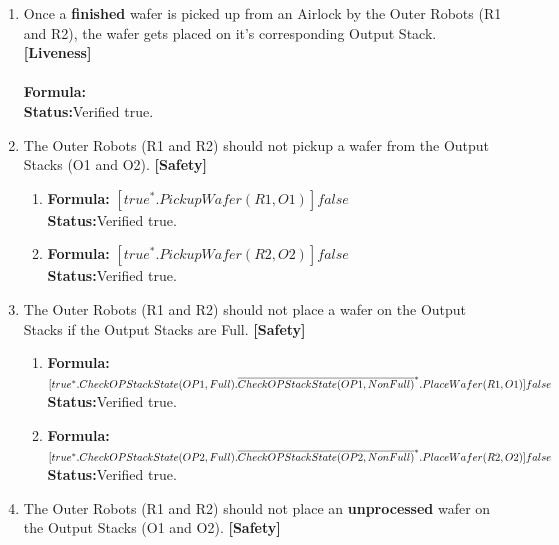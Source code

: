 \documentclass[a4paper,12pt]{article}
\begin{document}
\begin{enumerate}
		\item Once a \textbf{finished} wafer is picked up from an Airlock by the Outer Robots (R1 and R2), the wafer gets placed on it's corresponding Output Stack. \textbf{[Liveness]}
		\\
		\\\textbf{Formula:} 
		\\\textbf{Status:}Verified true.
		\item The Outer Robots (R1 and R2) should not pickup a wafer from the Output Stacks (O1 and O2). \textbf{[Safety]}
		\begin{enumerate}
			\item \textbf{Formula:} $[true^* . PickupWafer(R1, O1)] false$
			\\\textbf{Status:}Verified true.
			\item \textbf{Formula:} $[true^* . PickupWafer(R2, O2)] false$
			\\\textbf{Status:}Verified true.
		\end{enumerate}
		\item The Outer Robots (R1 and R2) should not place a wafer on the Output Stacks if the Output Stacks are Full. \textbf{[Safety]}
		\begin{enumerate}
			
			\item \textbf{Formula:} $[true^* . CheckOPStackState(OP1,Full). \\\overline{CheckOPStackState(OP1, NonFull)}^* .PlaceWafer(R1, O1)] false $
			\\\textbf{Status:}Verified true.
			
			\item \textbf{Formula:} $[true^* . CheckOPStackState(OP2,Full). \\\overline{CheckOPStackState(OP2, NonFull)}^* .PlaceWafer(R2, O2)] false $
			\\\textbf{Status:}Verified true.
		\end{enumerate}
		\item The Outer Robots (R1 and R2) should not place an \textbf{unprocessed} wafer on the Output Stacks (O1 and O2). \textbf{[Safety]}
		\begin{enumerate}
			

\end{enumerate}
\end{enumerate}
\end{document}

